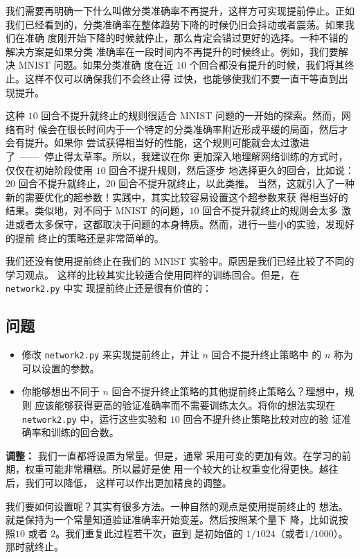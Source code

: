 我们需要再明确一下什么叫做分类准确率不再提升，这样方可实现提前停止。正如
我们已经看到的，分类准确率在整体趋势下降的时候仍旧会抖动或者震荡。如果我们在准确
度刚开始下降的时候就停止，那么肯定会错过更好的选择。一种不错的解决方案是如果分类
准确率在一段时间内不再提升的时候终止。例如，我们要解决 MNIST 问题。如果分类准确
度在近 $10$ 个回合都没有提升的时候，我们将其终止。这样不仅可以确保我们不会终止得
过快，也能够使我们不要一直干等直到出现提升。

这种 $10$ 回合不提升就终止的规则很适合 MNIST 问题的一开始的探索。然而，网络有时
候会在很长时间内于一个特定的分类准确率附近形成平缓的局面，然后才会有提升。如果你
尝试获得相当好的性能，这个规则可能就会太过激进了~——~停止得太草率。所以，我建议在你
更加深入地理解网络训练的方式时，仅仅在初始阶段使用 $10$ 回合不提升规则，然后逐步
地选择更久的回合，比如说：$20$ 回合不提升就终止，$20$ 回合不提升就终止，以此类推。
当然，这就引入了一种新的需要优化的超参数！实践中，其实比较容易设置这个超参数来获
得相当好的结果。类似地，对不同于 MNIST 的问题，$10$ 回合不提升就终止的规则会太多
激进或者太多保守，这都取决于问题的本身特质。然而，进行一些小的实验，发现好的提前
终止的策略还是非常简单的。

我们还没有使用提前终止在我们的 MNIST 实验中。原因是我们已经比较了不同的学习观点。
这样的比较其实比较适合使用同样的训练回合。但是，在 \lstinline!network2.py! 中实
现提前终止还是很有价值的：

\subsection*{问题}

\begin{itemize}
\item 修改 \lstinline!network2.py! 来实现提前终止，并让 $n$ 回合不提升终止策略中
  的 $n$ 称为可以设置的参数。
\item 你能够想出不同于 $n$ 回合不提升终止策略的其他提前终止策略么？理想中，规则
  应该能够获得更高的验证准确率而不需要训练太久。将你的想法实现在
  \lstinline!network2.py! 中，运行这些实验和 $10$ 回合不提升终止策略比较对应的验
  证准确率和训练的回合数。
\end{itemize}

\textbf{\learningrate{}调整：} 我们一直都将\learningrate{}设置为常量。但是，通常
采用可变的\learningrate{}更加有效。在学习的前期，权重可能非常糟糕。所以最好是使
用一个较大的\learningrate{}让权重变化得更快。越往后，我们可以降低\learningrate{}，
这样可以作出更加精良的调整。

我们要如何设置\learningrate{}呢？其实有很多方法。一种自然的观点是使用提前终止的
想法。就是保持\learningrate{}为一个常量知道验证准确率开始变差。然后按照某个量下
降\learningrate{}，比如说按照$10$ 或者 $2$。我们重复此过程若干次，直到%
\learningrate{}是初始值的 $1/1024$（或者$1/1000$）。那时就终止。

